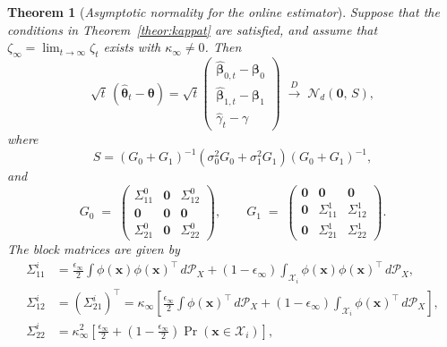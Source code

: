 \documentclass[12pt]{article}
\newtheorem{theorem}{Theorem}
\begin{document}
\begin{theorem}[{\emph{Asymptotic normality for the online estimator}}]
\label{theor:infer} 
Suppose that the conditions in Theorem~\ref{theor:kappat} are satisfied, and assume that $\zeta_\infty = \lim_{t \to \infty}\zeta_t$ exists with $\kappa_{\infty} \neq 0$. Then
\[
\sqrt{t}\, (\widehat{\bm{\theta}}_{t}-\bm{\theta}) =\sqrt{t}
\begin{pmatrix}
        \widehat{\bm{\beta}}_{0,t}-\bm{\beta}_0 \\
        \widehat{\bm{\beta}}_{1,t}-\bm{\beta}_1 \\
        \widehat{\gamma}_t-\gamma 
    \end{pmatrix}
\;\stackrel{D}{\longrightarrow}\;
\mathcal{N}_d(\bm{0},\, S), 
\]
where
\[
S= \left(G_0+G_1\right)^{-1} \left(\sigma_0^2 G_0+\sigma_1^2G_1 \right)\left(G_0+G_1\right)^{-1},
\]
and
\[
G_0 \;=\; 
    \begin{pmatrix}
        \Sigma_{11}^0 & \bm{0} & \Sigma_{12}^0 \\
        \bm{0} & \bm{0} & \bm{0} \\
        \Sigma_{21}^0 & \bm{0} & \Sigma_{22}^0
    \end{pmatrix}, 
    \qquad
G_1 \;=\; 
    \begin{pmatrix}
        \bm{0} & \bm{0} & \bm{0} \\
        \bm{0} & \Sigma_{11}^1 & \Sigma_{12}^1 \\
        \bm{0} & \Sigma_{21}^1 & \Sigma_{22}^1
    \end{pmatrix}.
\]
The block matrices are given by
\begin{equation}
\label{equ:si}
\begin{aligned}
\Sigma_{11}^i &= \frac{\epsilon_{\infty}}{2} \int \phi(\bm{x})\phi(\bm{x})^{\top} \,d\mathcal{P}_X 
    + (1-\epsilon_{\infty}) \int_{\mathcal{X}_i} \phi(\bm{x})\phi(\bm{x})^{\top} \,d\mathcal{P}_X, \\
\Sigma_{12}^i &= (\Sigma_{21}^i)^\top = \kappa_{\infty} \left[ \frac{\epsilon_{\infty}}{2} \int \phi(\bm{x})^{\top}\,d\mathcal{P}_X
    + (1-\epsilon_{\infty}) \int_{\mathcal{X}_i} \phi(\bm{x})^{\top} \,d\mathcal{P}_X \right], \\%
\Sigma_{22}^i &= \kappa_{\infty}^2 \left[ \frac{\epsilon_{\infty}}{2} 
    + \left(1-\frac{\epsilon_{\infty}}{2}\right) \Pr(\bm{x}\in\mathcal{X}_i) \right],
\end{aligned}
\end{equation}

\end{theorem}
\end{document}

